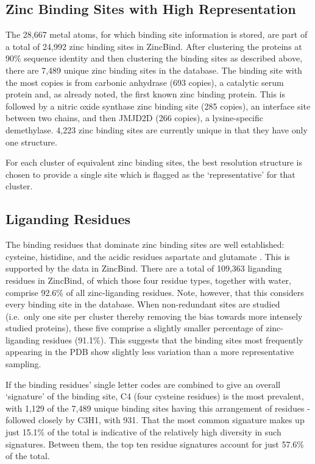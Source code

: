 \subsection{Zinc Binding Sites with High Representation}

The 28,667 metal atoms, for which binding site information is stored, are part of a total of 24,992 zinc binding sites in ZincBind. After clustering the proteins at 90\% sequence identity and then clustering the binding sites as described above, there are 7,489 unique zinc binding sites in the database. The binding site with the most copies is from carbonic anhydrase (693 copies), a catalytic serum protein and, as already noted, the first known zinc binding protein. This is followed by a nitric oxide synthase zinc binding site (285 copies), an interface site between two chains, and then JMJD2D (266 copies), a lysine-specific demethylase. 4,223 zinc binding sites are currently unique in that they have only one structure.

For each cluster of equivalent zinc binding sites, the best resolution structure is chosen to provide a single site which is flagged as the `representative' for that cluster.

\subsection{Liganding Residues}

The binding residues that dominate zinc binding sites are well established: cysteine, histidine, and the acidic residues aspartate and glutamate . This is supported by the data in ZincBind. There are a total of 109,363 liganding residues in ZincBind, of which those four residue types, together with water, comprise 92.6\% of all zinc-liganding residues. Note, however, that this considers every binding site in the database. When non-redundant sites are studied (i.e.\ only one site per cluster thereby removing the bias towards more intensely studied proteins), these five comprise a slightly smaller percentage of zinc-liganding residues (91.1\%). This suggests that the binding sites most frequently appearing in the PDB show slightly less variation than a more representative sampling.

If the binding residues' single letter codes are combined to give an overall `signature' of the binding site, C4 (four cysteine residues) is the most prevalent, with 1,129 of the 7,489 unique binding sites having this arrangement of residues - followed closely by C3H1, with 931. That the most common signature makes up just 15.1\% of the total is indicative of the relatively high diversity in such signatures. Between them, the top ten residue signatures account for just 57.6\% of the total.

